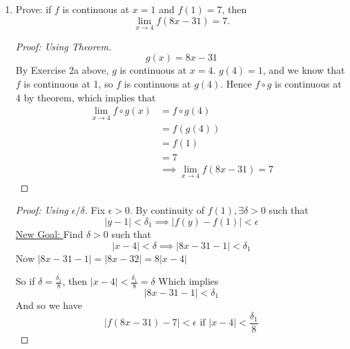 \documentclass{article} %
\theoremstyle{plain}
\theoremstyle{definition}
\theoremstyle{case}
\begin{document}
\begin{enumerate}[label={\fbox{\textbf{Exercise \#\arabic* :}}}]
  \renewcommand\qedsymbol{\Lightning}
  \begin{proof}[\textbf{Proof by contradiction}]  Towards a contradiction,
    let's assume that a limit exists.  In this case, $f(x)$ is continuous
    at a point $q \in \mathbb{Q}$, and $f(q) = 1$, so the 
    $\lim_{x \to q} f(x) = 1$.
    By the continuity of $f$, $\exists \delta >0, a \in \mathbb{R}$
    such that
      \[ |x-q| < \delta \implies |f(x) - f(q)| < \epsilon \]
    Take $\delta = 3$.  Then we would like to be able to say that 
    $\forall x \in \mathbb{R}$
    \[ |x-q| < \delta \implies |f(x) - f(q)| = 1 -1 =0 \]
      However, by Theorem 1, there exists an irrational number
      $i \in (q - \delta, q + \delta)$ where $|f(x) - f(i)| = 1 - 0 =1$
      So the limit does not exist.
  \end{proof} 
  \renewcommand\qedsymbol{$\square$}

\newpage
\item Prove: if $f$ is continuous at $x=1$ and $f(1) = 7$,
then
$$
\lim_{x \rightarrow 4} f(8x-31) = 7.
$$

\begin{proof}[Proof: Using Theorem]

  \[ g(x) = 8x - 31 \]
    By Exercise 2a above, $g$ is continuous at $x=4$.  $g(4) = 1$, and
    we know that $f$ is continuous at 1, so $f$ 
    is continuous at $g(4)$.  Hence $f \circ g$ is continuous at 4 by
    theorem, which implies that
    \begin{align*}
      \lim_{x \to 4} f\circ g(x) &= f\circ g(4) \\
                            &= f(g(4)) \\
                            &= f(1) \\
                            &= 7 \\
                            &\implies \lim_{x \to 4} f(8x-31) = 7
    \end{align*}
\end{proof}

\begin{proof}[Proof: Using $\epsilon / \delta$]

    Fix $\epsilon > 0$.  By continuity of $f(1), \exists \delta >0$
    such that 
    \[ |y-1| < \delta_1 \implies |f(y) - f(1)| < \epsilon \]
    \underline{New Goal: } Find $\delta > 0$ such that
      \[ |x-4|< \delta \implies |8x-31 - 1| < \delta_1 \]
      Now $|8x - 31 - 1| = |8x - 32| = 8|x-4|$

      So if $\delta = \frac{\delta_1}{8}$, then
      $|x-4| < \frac{\delta_1}{8} =  \delta$
      Which implies
      \[ |8x - 31- 1| < \delta_1 \]
      And so we have
        \[ |f(8x-31)-7| <\epsilon \text{ if } |x-4| < \frac{\delta_1}{8} \]
\end{proof}


\end{enumerate}
\end{document}
